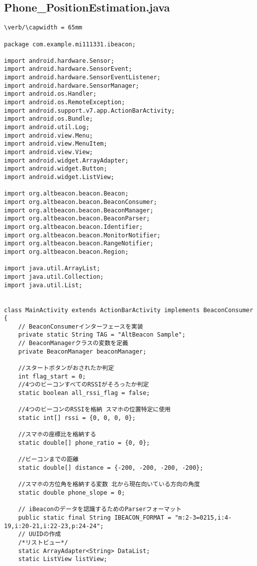 \documentclass[11pt,a4j]{jarticle}
\begin{document}
\subsection{Phone\_PositionEstimation.java}
%	
\begin{verbatim}
\verb/\capwidth = 65mm

package com.example.mi111331.ibeacon;

import android.hardware.Sensor;
import android.hardware.SensorEvent;
import android.hardware.SensorEventListener;
import android.hardware.SensorManager;
import android.os.Handler;
import android.os.RemoteException;
import android.support.v7.app.ActionBarActivity;
import android.os.Bundle;
import android.util.Log;
import android.view.Menu;
import android.view.MenuItem;
import android.view.View;
import android.widget.ArrayAdapter;
import android.widget.Button;
import android.widget.ListView;

import org.altbeacon.beacon.Beacon;
import org.altbeacon.beacon.BeaconConsumer;
import org.altbeacon.beacon.BeaconManager;
import org.altbeacon.beacon.BeaconParser;
import org.altbeacon.beacon.Identifier;
import org.altbeacon.beacon.MonitorNotifier;
import org.altbeacon.beacon.RangeNotifier;
import org.altbeacon.beacon.Region;

import java.util.ArrayList;
import java.util.Collection;
import java.util.List;


class MainActivity extends ActionBarActivity implements BeaconConsumer {
    // BeaconConsumerインターフェースを実装
    private static String TAG = "AltBeacon Sample";
    // BeaconManagerクラスの変数を定義
    private BeaconManager beaconManager;

    //スタートボタンがおされたか判定
    int flag_start = 0;
    //4つのビーコンすべてのRSSIがそろったか判定
    static boolean all_rssi_flag = false;

    //4つのビーコンのRSSIを格納 スマホの位置特定に使用
    static int[] rssi = {0, 0, 0, 0};

    //スマホの座標比を格納する
    static double[] phone_ratio = {0, 0};

    //ビーコンまでの距離
    static double[] distance = {-200, -200, -200, -200};

    //スマホの方位角を格納する変数 北から現在向いている方向の角度
    static double phone_slope = 0;

    // iBeaconのデータを認識するためのParserフォーマット
    public static final String IBEACON_FORMAT = "m:2-3=0215,i:4-19,i:20-21,i:22-23,p:24-24";
    // UUIDの作成
    /*リストビュー*/
    static ArrayAdapter<String> DataList;
    static ListView listView;


\end{verbatim}
\end{document}
